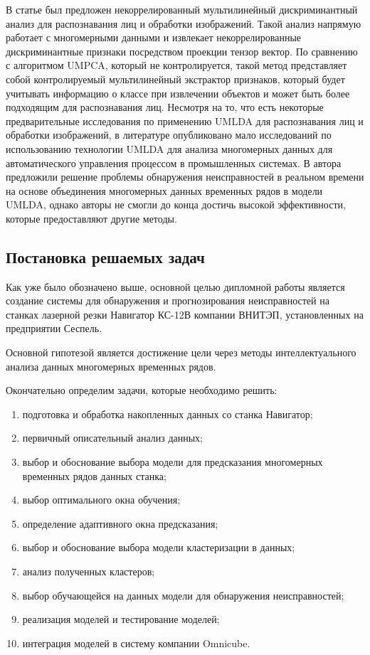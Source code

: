 В статье \cite{4-17} был предложен некоррелированный мультилинейный дискриминантный анализ 
для распознавания лиц и обработки изображений. 
Такой анализ напрямую работает с многомерными данными и извлекает некоррелированные 
дискриминантные признаки посредством проекции тензор вектор. 
По сравнению с алгоритмом UMPCA, который не контролируется, такой метод представляет собой контролируемый 
мультилинейный экстрактор признаков, который будет учитывать информацию о классе при извлечении объектов 
и может быть более подходящим для распознавания лиц. 
Несмотря на то, что есть некоторые предварительные исследования по применению UMLDA для распознавания лиц и обработки изображений, 
в литературе опубликовано мало исследований по использованию технологии 
UMLDA для анализа многомерных данных для автоматического управления процессом в промышленных системах.
В \cite{4} автора предложили решение проблемы обнаружения неисправностей в реальном времени
на основе объединения многомерных данных временных рядов в модели UMLDA,
однако авторы не смогли до конца достичь высокой эффективности,
которые предоставляют другие методы.

\subsection{Постановка решаемых задач}

Как уже было обозначено выше, основной целью дипломной работы является создание системы
для обнаружения и прогнозирования неисправностей на станках лазерной резки Навигатор КС-12В компании ВНИТЭП,
установленных на предприятии Сеспель.

Основной гипотезой является достижение цели через
методы интеллектуального анализа данных многомерных временных рядов.

Окончательно определим задачи, которые необходимо решить:

\begin{enumerate}
    \item подготовка и обработка накопленных данных со станка Навигатор;
    \item первичный описательный анализ данных;
    \item выбор и обоснование выбора модели для предсказания многомерных временных рядов данных станка;
    \item выбор оптимального окна обучения;
    \item определение адаптивного окна предсказания;
    \item выбор и обоснование выбора модели кластеризации в данных;
    \item анализ полученных кластеров;
    \item выбор обучающейся на данных модели для обнаружения неисправностей;    
    \item реализация моделей и тестирование моделей;
    \item интеграция моделей в систему компании Omnicube.
\end{enumerate}


